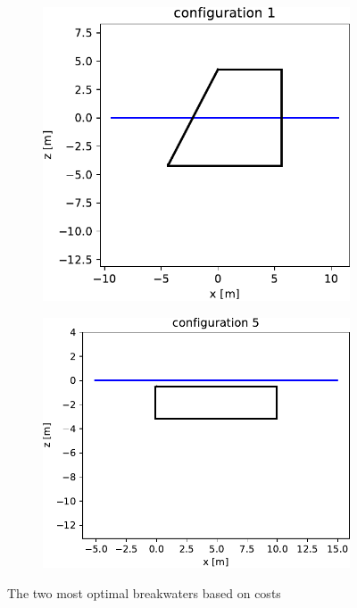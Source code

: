 \begin{figure}[h]
    \centering
    \begin{subfigure}[b]{0.475\textwidth}
        \centering
        \includegraphics[width=\textwidth]{figures/ComFLOW/Breakwater Geometries/Design Iteration 1 captive/top from costs/breakwater_geometry1.pdf}
        \caption[]%
        {{\small}}    
        \label{fig: opt breakwater 1 costs DI1}
    \end{subfigure}
    \hfill
    \begin{subfigure}[b]{0.475\textwidth}  
        \centering 
        \includegraphics[width=\textwidth]{figures/ComFLOW/Breakwater Geometries/Design Iteration 1 captive/top from costs/breakwater_geometry5.pdf}
        \caption[]%
        {{\small}}    
        \label{fig: opt breakwater 7 costs DI1}
    \end{subfigure}
    
    \caption{The two most optimal breakwaters based on costs}
    \label{fig: two most optimal breakwaters Eco DI1 H3}
\end{figure}


